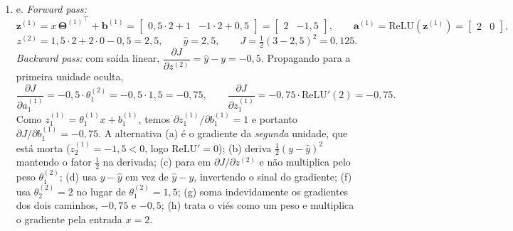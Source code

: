 \documentclass{dlproblemset}
\begin{document}
\begin{enumerate}[1)]
    \item e. \textit{Forward pass:}
    \[
    \mathbf{z}^{(1)} = x\,{\mathbf{\Theta}^{(1)}}^{\top} + \mathbf{b}^{(1)}
    = \begin{bmatrix} 0{,}5 \cdot 2 + 1 & -1 \cdot 2 + 0{,}5 \end{bmatrix} = \begin{bmatrix} 2 & -1{,}5 \end{bmatrix},
    \qquad
    \mathbf{a}^{(1)} = \mathrm{ReLU}(\mathbf{z}^{(1)}) = \begin{bmatrix} 2 & 0 \end{bmatrix},
    \]
    \[
    z^{(2)} = 1{,}5 \cdot 2 + 2 \cdot 0 - 0{,}5 = 2{,}5, \qquad \hat{y} = 2{,}5, \qquad J = \tfrac{1}{2}(3 - 2{,}5)^2 = 0{,}125 .
    \]
    \textit{Backward pass:} com saída linear, $\dfrac{\partial J}{\partial z^{(2)}} = \hat{y} - y = -0{,}5$. Propagando para a primeira unidade oculta,
    \[
    \frac{\partial J}{\partial a^{(1)}_1} = -0{,}5 \cdot \theta^{(2)}_1 = -0{,}5 \cdot 1{,}5 = -0{,}75,
    \qquad
    \frac{\partial J}{\partial z^{(1)}_1} = -0{,}75 \cdot \mathrm{ReLU}'(2) = -0{,}75 .
    \]
    Como $z^{(1)}_1 = \theta^{(1)}_1 x + b^{(1)}_1$, temos $\partial z^{(1)}_1 / \partial b^{(1)}_1 = 1$ e portanto $\partial J / \partial b^{(1)}_1 = -0{,}75$. A alternativa (a) é o gradiente da \emph{segunda} unidade, que está morta ($z^{(1)}_2 = -1{,}5 < 0$, logo $\mathrm{ReLU}' = 0$); (b) deriva $\tfrac{1}{2}(y - \hat{y})^2$ mantendo o fator $\tfrac{1}{2}$ na derivada; (c) para em $\partial J / \partial z^{(2)}$ e não multiplica pelo peso $\theta^{(2)}_1$; (d) usa $y - \hat{y}$ em vez de $\hat{y} - y$, invertendo o sinal do gradiente; (f) usa $\theta^{(2)}_2 = 2$ no lugar de $\theta^{(2)}_1 = 1{,}5$; (g) soma indevidamente os gradientes dos dois caminhos, $-0{,}75$ e $-0{,}5$; (h) trata o viés como um peso e multiplica o gradiente pela entrada $x = 2$.


\end{enumerate}
\end{document}
